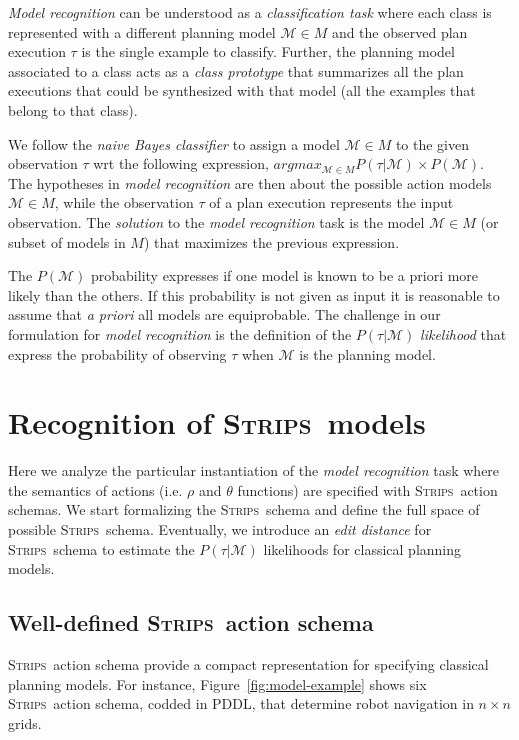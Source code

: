 \documentclass[letterpaper]{article} %
\newcommand{\strips}{\textsc{Strips}}     %
\begin{document}
{\em Model recognition} can be understood as a {\em classification task} where each class is represented with a different planning model $\mathcal{M}\in M$ and the observed plan execution $\tau$ is the single example to classify. Further, the planning model associated to a class acts as a {\em class prototype} that summarizes all the plan executions that could be synthesized with that model (all the examples that belong to that class).

We follow the {\em naive Bayes classifier} to assign a model $\mathcal{M}\in M$ to the given observation $\tau$ wrt the following expression, $argmax_{\mathcal{M}\in M} P(\tau|\mathcal{M})\times P(\mathcal{M})$. The hypotheses in {\em model recognition} are then about the possible action models $\mathcal{M}\in M$, while the observation $\tau$ of a plan execution represents the input observation. The {\em solution} to the {\em model recognition} task is the model $\mathcal{M}\in M$ (or subset of models in $M$) that maximizes the previous expression.

The $P(\mathcal{M})$ probability expresses if one model is known to be a priori more likely than the others. If this probability is not given as input it is reasonable to assume that {\em a priori} all models are equiprobable. The challenge in our formulation for {\em model recognition} is the definition of the $P(\tau|\mathcal{M})$ {\em likelihood} that express the probability of observing $\tau$ when $\mathcal{M}$ is the planning model.



\section{Recognition of \strips\ models}
\label{sec:asPlanning}
Here we analyze the particular instantiation of the {\em model recognition} task where the semantics of actions (i.e. $\rho$ and $\theta$ functions) are specified with \strips\ action schemas. We start formalizing the \strips\ schema and define the full space of possible \strips\ schema. Eventually, we introduce an {\em edit distance} for \strips\ schema to estimate the $P(\tau|\mathcal{M})$ likelihoods for classical planning models.

\subsection{Well-defined \strips\ action schema}
\strips\ action schema provide a compact representation for specifying classical planning models. For instance, Figure~\ref{fig:model-example} shows six \strips\ action schema, codded in PDDL, that determine robot navigation in $n\times n$ grids.
\end{document}
